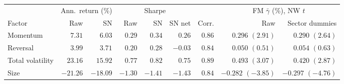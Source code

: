 \begin{tabular}{lrrrrrrrr}
\toprule
& \multicolumn{2}{c}{Ann.\ return (\%)} & \multicolumn{3}{c}{Sharpe} & & \multicolumn{2}{c}{FM $\bar\gamma$ (\%), NW $t$} \\
\cmidrule(lr){2-3} \cmidrule(lr){4-6} \cmidrule(lr){8-9}
Factor & Raw & SN & Raw & SN & SN net & Corr. & Raw & Sector dummies \\
\midrule
Momentum & $7.31$ & $6.03$ & $0.29$ & $0.34$ & $0.26$ & $0.86$ & $0.296$ $(2.91)$ & $0.290$ $(2.64)$ \\
Reversal & $3.99$ & $3.71$ & $0.20$ & $0.28$ & $-0.03$ & $0.84$ & $0.050$ $(0.51)$ & $0.054$ $(0.63)$ \\
Total volatility & $23.16$ & $15.92$ & $0.77$ & $0.82$ & $0.75$ & $0.89$ & $0.493$ $(3.07)$ & $0.420$ $(2.87)$ \\
Size & $-21.26$ & $-18.09$ & $-1.30$ & $-1.41$ & $-1.43$ & $0.84$ & $-0.282$ $(-3.85)$ & $-0.297$ $(-4.76)$ \\
\bottomrule
\end{tabular}
